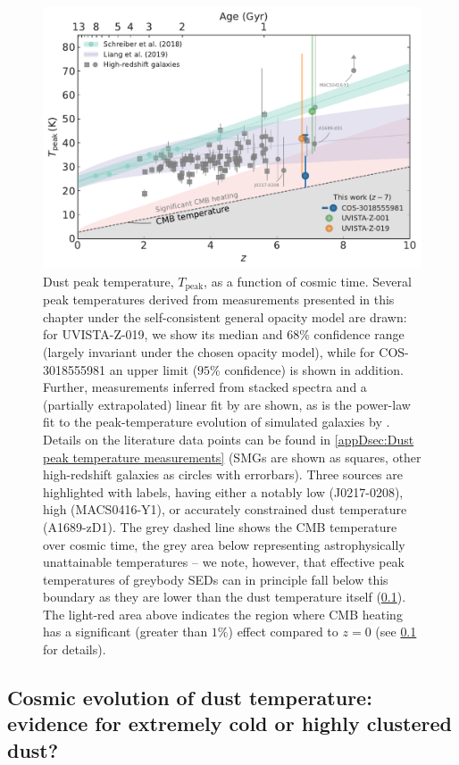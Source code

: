\begin{figure}
    \centering
    \includegraphics[width=0.8\linewidth]{"Plots/ChapterD/Redshift_T_peak"}
    \caption[Dust peak temperature as a function of redshift.]{Dust peak temperature, $T_\text{peak}$, as a function of cosmic time. Several peak temperatures derived from measurements presented in this chapter under the self-consistent general opacity model are drawn: for UVISTA-Z-019, we show its median and $68\%$ confidence range (largely invariant under the chosen opacity model), while for COS-3018555981 an upper limit ($95\%$ confidence) is shown in addition. Further, measurements inferred from stacked spectra and a (partially extrapolated) linear fit by \citet{2018A&A...609A..30S} are shown, as is the power-law fit to the peak-temperature evolution of simulated galaxies by \citet{2019MNRAS.489.1397L}. Details on the literature data points can be found in \cref{appDsec:Dust peak temperature measurements} (SMGs are shown as squares, other high-redshift galaxies as circles with errorbars). Three sources are highlighted with labels, having either a notably low (J0217-0208), high (MACS0416-Y1), or accurately constrained dust temperature (A1689-zD1). The grey dashed line shows the CMB temperature over cosmic time, the grey area below representing astrophysically unattainable temperatures -- we note, however, that effective peak temperatures of greybody SEDs can in principle fall below this boundary as they are lower than the dust temperature itself (\cref{chDssec:Discussion:Dust_temperatures}). The light-red area above indicates the region where CMB heating has a significant (greater than $1\%$) effect compared to $z=0$ (see \cref{chDssec:Discussion:Dust_temperatures} for details).
    }
    \label{chDfig:T_peak_evolution}
\end{figure}

\subsection{Cosmic evolution of dust temperature: evidence for extremely cold or highly clustered dust?}
\label{chDssec:Discussion:Dust_temperatures}

